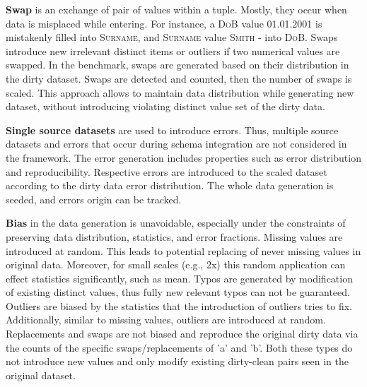 \textbf{Swap} is an exchange of pair of values within a tuple. 
Mostly, they occur when data is misplaced while entering.
For instance, a \textsc{DoB} value \textsc{01.01.2001} is mistakenly filled into \textsc{Surname}, and \textsc{Surname} value \textsc{Smith} - into \textsc{DoB}.
Swaps introduce new irrelevant distinct items or outliers if two numerical values are swapped.
In the benchmark, swaps are generated based on their distribution in the dirty dataset. Swaps are detected and counted, then the number of swaps is scaled. This approach allows to maintain data distribution while generating new dataset, without introducing violating distinct value set of the dirty data.

\textbf{Single source datasets} are used to introduce errors. 
Thus, multiple source datasets and errors that occur during schema integration are not considered in the framework.
The error generation includes properties such as error distribution and reproducibility. Respective errors are introduced to the scaled dataset according to the dirty data error distribution. The whole data generation is seeded, and errors origin can be tracked.


\textbf{Bias} in the data generation is unavoidable, especially under the constraints of preserving data distribution, statistics, and error fractions. 
Missing values are introduced at random. This leads to potential replacing of never missing values in original data.
Moreover, for small scales (e.g., 2x) this random application can effect statistics significantly, such as mean.
Typos are generated by modification of existing distinct values, thus fully new relevant typos can not be guaranteed.
Outliers are biased by the statistics that the introduction of outliers tries to fix.
Additionally, similar to missing values, outliers are introduced at random.
Replacements and swaps are not biased and reproduce the original dirty data via the counts of the specific swaps/replacements of 'a' and 'b'.
Both these types do not introduce new values and only modify existing dirty-clean pairs seen in the original dataset.
